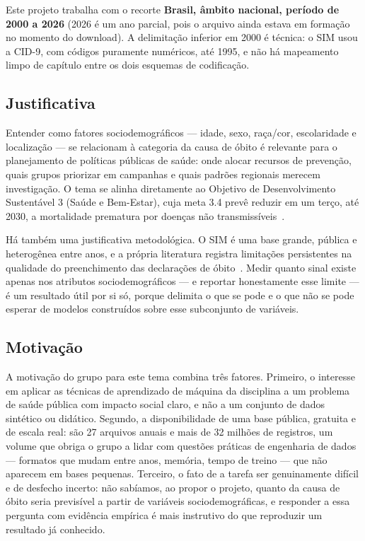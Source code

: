 \documentclass[12pt]{article}
\begin{document}
Este projeto trabalha com o recorte \textbf{Brasil, âmbito nacional, período
de 2000 a 2026} (2026 é um ano parcial, pois o arquivo ainda estava em
formação no momento do download). A delimitação inferior em 2000 é técnica: o
SIM usou a CID-9, com códigos puramente numéricos, até 1995, e não há
mapeamento limpo de capítulo entre os dois esquemas de codificação.

\subsection{Justificativa}

Entender como fatores sociodemográficos --- idade, sexo, raça/cor,
escolaridade e localização --- se relacionam à categoria da causa de óbito é
relevante para o planejamento de políticas públicas de saúde: onde alocar
recursos de prevenção, quais grupos priorizar em campanhas e quais padrões
regionais merecem investigação. O tema se alinha diretamente ao Objetivo de
Desenvolvimento Sustentável 3 (Saúde e Bem-Estar), cuja meta 3.4 prevê reduzir
em um terço, até 2030, a mortalidade prematura por doenças não
transmissíveis~\cite{ods3}.

Há também uma justificativa metodológica. O SIM é uma base grande, pública e
heterogênea entre anos, e a própria literatura registra limitações
persistentes na qualidade do preenchimento das declarações de
óbito~\cite{morais2017}. Medir quanto sinal existe apenas nos atributos
sociodemográficos --- e reportar honestamente esse limite --- é um resultado
útil por si só, porque delimita o que se pode e o que não se pode esperar de
modelos construídos sobre esse subconjunto de variáveis.

\subsection{Motivação}

A motivação do grupo para este tema combina três fatores. Primeiro, o
interesse em aplicar as técnicas de aprendizado de máquina da disciplina a um
problema de saúde pública com impacto social claro, e não a um conjunto de
dados sintético ou didático. Segundo, a disponibilidade de uma base pública,
gratuita e de escala real: são 27 arquivos anuais e mais de 32 milhões de
registros, um volume que obriga o grupo a lidar com questões práticas de
engenharia de dados --- formatos que mudam entre anos, memória, tempo de
treino --- que não aparecem em bases pequenas. Terceiro, o fato de a tarefa
ser genuinamente difícil e de desfecho incerto: não sabíamos, ao propor o
projeto, quanto da causa de óbito seria previsível a partir de variáveis
sociodemográficas, e responder a essa pergunta com evidência empírica é mais
instrutivo do que reproduzir um resultado já conhecido.
\end{document}
